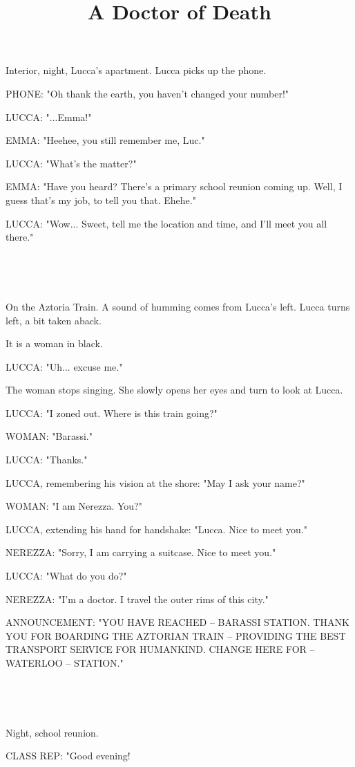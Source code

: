 \documentclass[11pt]{article}
\begin{document}
\ttfamily
\title{A Doctor of Death}
\maketitle

Interior, night, Lucca's apartment.
Lucca picks up the phone. 

PHONE: "Oh thank the earth, you haven't changed your number!"

LUCCA: "...Emma!"

EMMA: "Heehee, you still remember me, Luc."

LUCCA: "What's the matter?"

EMMA: "Have you heard? 
There's a primary school reunion coming up.
Well, I guess that's my job, to tell you that. 
Ehehe."

LUCCA: "Wow... Sweet, tell me the location and time, and I'll meet you all there."

\ 

\ 

On the Aztoria Train.
A sound of humming comes from Lucca's left.
Lucca turns left, a bit taken aback.

It is a woman in black.

LUCCA: "Uh... excuse me."

The woman stops singing.
She slowly opens her eyes and turn to look at Lucca.

LUCCA: "I zoned out. Where is this train going?"

WOMAN: "Barassi."

LUCCA: "Thanks."

LUCCA, remembering his vision at the shore: "May I ask your name?"

WOMAN: "I am Nerezza. You?"

LUCCA, extending his hand for handshake: "Lucca. Nice to meet you."

NEREZZA: "Sorry, I am carrying a suitcase. Nice to meet you."

LUCCA: "What do you do?"

NEREZZA: "I'm a doctor. I travel the outer rims of this city."

ANNOUNCEMENT: "YOU HAVE REACHED -- BARASSI STATION. 
THANK YOU FOR BOARDING THE AZTORIAN TRAIN -- PROVIDING THE BEST TRANSPORT SERVICE FOR HUMANKIND.
CHANGE HERE FOR -- WATERLOO -- STATION."

\ 

\ 

Night, school reunion.

CLASS REP: "Good evening!
\end{document}
